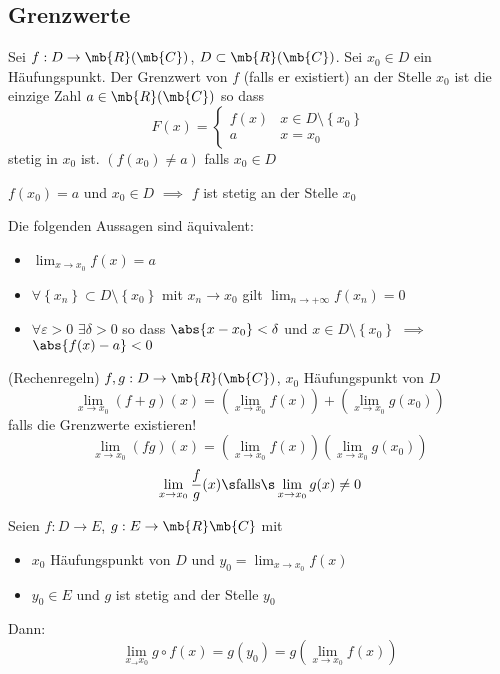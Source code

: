 \subsection{Grenzwerte}
\begin{Def}
  Sei $f:D\to\mb{R}(\mb{C})$, $D\subset \mb{R}(\mb{C})$. Sei $x_0\in D$ ein Häufungspunkt. Der Grenzwert von $f$ (falls er existiert) an der Stelle $x_0$ ist die einzige Zahl $a\in\mb{R}(\mb{C})$ so dass
  \[F(x)=\begin{cases}
    f(x)&x\in D\setminus \left\{ x_0 \right\}\\
    a&x=x_0
  \end{cases}\]
  stetig in $x_0$ ist. $\left( f(x_0)\neq a \right)$ falls $x_0\in D$
\end{Def}
\begin{Bem}
  $f(x_0)=a$ und $x_0\in D$ $\implies$ $f$ ist stetig an der Stelle $x_0$
\end{Bem}
\begin{Sat}
  Die folgenden Aussagen sind äquivalent:
  \begin{itemize}
    \item $\lim_{x\to x_0}f(x)=a$
    \item $\forall \left\{ x_n \right\}\subset D\setminus\left\{ x_0 \right\}$ mit $x_n\to x_0$ gilt $\lim_{n\to +\infty} f(x_n)=0$
    \item $\forall \varepsilon >0$ $\exists\delta>0$ so dass $\abs{x-x_0}<\delta$ und $x\in D\setminus\left\{ x_0 \right\}$ $\implies$ $\abs{f(x)-a}<0$
  \end{itemize}
\end{Sat}
\begin{Sat}
  (Rechenregeln) $f,g:D\to\mb{R}(\mb{C})$, $x_0$ Häufungspunkt von $D$
  \[\lim_{x\to x_0}(f+g)(x)=\left( \lim_{x\to x_0} f(x) \right) + \left( \lim_{x\to x_0} g(x_0) \right)\]
  falls die Grenzwerte existieren!
  \[\lim_{x\to x_0}(fg)(x)=\left( \lim_{x\to x_0} f(x) \right) \left( \lim_{x\to x_0} g(x_0) \right)\]
  \[\lim_{x\to x_0}\frac{f}{g}(x)\s\text{falls}\s\lim_{x\to x_0}g(x)\neq 0\]
\end{Sat}
\begin{Sat}
  Seien $f:D\to E$, $g:E\to \mb{R}\mb{C}$ mit
  \begin{itemize}
    \item $x_0$ Häufungspunkt von $D$ und $y_0=\lim_{x\to x_0}f(x)$
    \item $y_0\in E$ und $g$ ist stetig and der Stelle $y_0$
  \end{itemize}
  Dann:
  \[\lim_{x_\to x_0} g\circ f(x)=g(y_0)=g(\lim_{x\to x_0}f(x))\]
\end{Sat}
